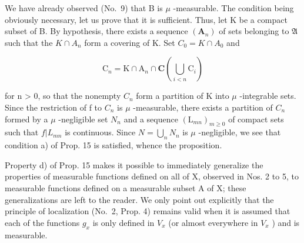 We have already observed (No.~9) that B is \(\mu\) -measurable. The condition being obviously necessary, let us prove that it is sufficient. Thus, let K be a compact subset of B. By hypothesis, there exists a sequence \((\mathbf{A}_{n})\) of sets belonging to \(\mathfrak{A}\) such that the \(K \cap A_{n}\) form a covering of K. Set \(C_{0} = K \cap A_{0}\) and

\[
\mathrm{C} _ {n} = \mathrm{K} \cap \mathrm{A} _ {n} \cap \mathbf {C} \left(\bigcup_ {i <   n} \mathrm{C} _ {i}\right)
\]

for n \textgreater{} 0, so that the nonempty \(C_{n}\) form a partition of K into \(\mu\) -integrable sets. Since the restriction of f to \(C_{n}\) is \(\mu\) -measurable, there exists a partition of \(C_{n}\) formed by a \(\mu\) -negligible set \(N_{n}\) and a sequence \((\mathrm{L}_{mn})_{m \geqslant 0}\) of compact sets such that \(f|L_{mn}\) is continuous. Since \(N = \bigcup_{n} N_{n}\) is \(\mu\) -negligible, we see that condition a) of Prop. 15 is satisfied, whence the proposition.

Property d) of Prop. 15 makes it possible to immediately generalize the properties of measurable functions defined on all of X, observed in Nos. 2 to 5, to measurable functions defined on a measurable subset A of X; these generalizations are left to the reader. We only point out explicitly that the principle of localization (No.~2, Prop. 4) remains valid when it is assumed that each of the functions \(g_{x}\) is only defined in \(V_{x}\) (or almost everywhere in \(V_{x}\) ) and is measurable.

